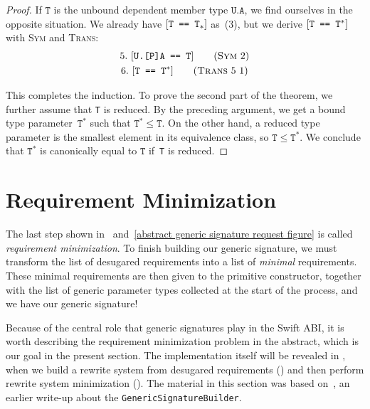 \documentclass[../generics]{subfiles}
\begin{document}
\begin{proof}
If $\texttt{T}$ is the unbound dependent member type $\texttt{U.A}$, we find ourselves in the opposite situation. We already have $[\texttt{T == $\texttt{T}_*$}]$ as~(3), but we derive $[\texttt{T == $\texttt{T}^*$}]$ with \textsc{Sym} and \textsc{Trans}:
\begin{gather*}
\SymStep{2}{U.[P]A}{T}{5}\\
\TransStep{5}{1}{T}{$\texttt{T}^*$}{6}
\end{gather*}

This completes the induction. To prove the second part of the theorem, we further assume that \texttt{T} is reduced. By the preceding argument, we get a bound type parameter~$\texttt{T}^*$ such that $\texttt{T}^*\le\texttt{T}$. On the other hand, a reduced type parameter is the smallest element in its equivalence class, so $\texttt{T}\le\texttt{T}^*$. We conclude that $\texttt{T}^*$ is canonically equal to $\texttt{T}$ if~\texttt{T} is reduced.
\end{proof}

\section{Requirement Minimization}\label{minimal requirements}

The last step shown in ~and~\ref{abstract generic signature request figure} is called \emph{requirement minimization}. To finish building our generic signature, we must transform the list of desugared requirements into a list of \emph{minimal} requirements. These minimal requirements are then given to the primitive constructor, together with the list of generic parameter types collected at the start of the process, and we have our generic signature!

Because of the central role that generic signatures play in the Swift ABI, it is worth describing the requirement minimization problem in the abstract, which is our goal in the present section. The implementation itself will be revealed in , when we build a rewrite system from desugared requirements () and then perform rewrite system minimization (). The material in this section was based on~\cite{gensig}, an earlier write-up about the \texttt{GenericSignatureBuilder}.
\end{document}
